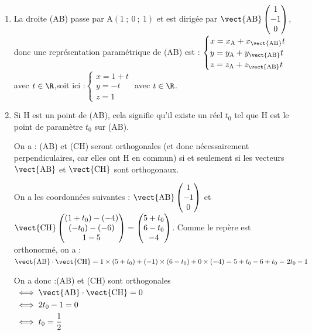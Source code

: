 \begin{enumerate}
	\item La droite (AB) passe par A$(1~;~0~;~1)$ et est dirigée par $\vect{\mathrm{AB}} \begin{pmatrix}1\\-1\\0\end{pmatrix}$, donc une représentation paramétrique de (AB) est :
	\quad
	$\begin{cases}x = x_\mathrm{A} + x_{\mathrm{\vect{\mathrm{AB}}}}t\\y = y_\mathrm{A} + y_{\mathrm{\vect{\mathrm{AB}}}}t\\z = z _\mathrm{A} + z _{\mathrm{\vect{\mathrm{AB}}}}t \end{cases}$ avec $t \in\R$,\quad soit ici :\quad $\begin{cases} x = 1 + t\\y= -t\\z = 1	\end{cases}$ avec $t \in \R$.

	\item Si H est un point de (AB), cela signifie qu'il existe un réel $t_0$ tel que H est le point de paramètre $t_0$ sur (AB).

On a : (AB) et (CH) seront orthogonales (et donc nécessairement perpendiculaires, car elles ont H en commun) si et seulement si les vecteurs $\vect{\mathrm{AB}}$ et $\vect{\mathrm{CH}}$ sont orthogonaux.

On a les coordonnées suivantes : \quad $\vect{\mathrm{AB}} \begin{pmatrix}1\\-1\\0\end{pmatrix}$ et $\vect{\mathrm{CH}}\begin{pmatrix}(1 + t_0) - (-4)\\(-t_0) - (-6) \\1 - 5\end{pmatrix} =\begin{pmatrix}5 + t_0 \\ 6 - t_0 \\ -4\end{pmatrix}$. Comme le repère est orthonormé, on a :\quad $\vect{\mathrm{AB}}\cdot\vect{\mathrm{CH}} = 1\times (5 + t_0) + (-1) \times (6 - t_0) + 0\times (-4) = 5 + t_0 - 6 + t_0 = 2t_0 - 1$

On a donc :\quad (AB) et (CH) sont orthogonales $\aligned[t] &\iff \vect{\mathrm{AB}}\cdot \vect{\mathrm{CH}} = 0\\
	&\iff 2t_0 - 1 = 0\\
	&\iff t_0 = \dfrac{1}{2}\endaligned$


\end{enumerate}
